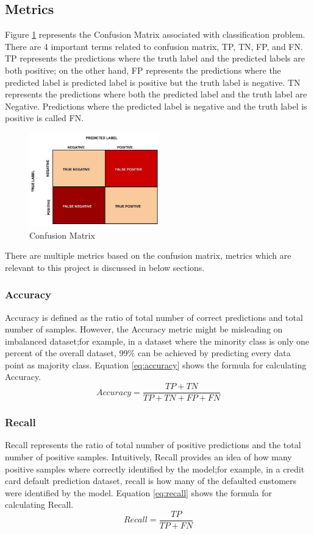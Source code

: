 \documentclass[twoside,11pt,a4paper]{article}
\begin{document}
\subsection{Metrics}
Figure \ref{fig:confusion_matrix} represents the Confusion Matrix associated with classification problem. There are 4 important terms related to confusion matrix, \acf{TP}, \acf{TN}, \acf{FP}, and \acf{FN}. \acs{TP} represents the predictions where the truth label and the predicted labels are both positive; on the other hand, \acs{FP} represents the predictions where the predicted label is predicted label is positive but the truth label is negative. \acs{TN} represents the predictions where both the predicted label and the truth label are Negative. Predictions where the predicted label is negative and the truth label is positive is called \acs{FN}.
\begin{figure}[ht]
	\centering
	\includegraphics[width=0.5\textwidth]{confusion_matrix}
	\caption[Confusion Matrix]{Confusion Matrix \citep{confusion_matrix}}
	\label{fig:confusion_matrix}
\end{figure}
There are multiple metrics based on the confusion matrix, metrics which are relevant to this project is discussed in below sections.
\subsubsection{Accuracy}
Accuracy is defined as the ratio of total number of correct predictions and total number of samples. However, the Accuracy metric might be misleading on imbalanced dataset;for example, in a dataset where the minority class is only one percent of the overall dataset, 99\% can be achieved by predicting every data point as majority class. Equation \ref{eq:accuracy} shows the formula for calculating Accuracy.
\begin{equation} \label{eq:accuracy}
	Accuracy = \frac{TP+TN}{TP+TN+FP+FN}
\end{equation}
\subsubsection{Recall}
Recall represents the ratio of total number of positive predictions and the total number of positive samples. Intuitively, Recall provides an idea of how many positive samples where correctly identified by the model;for example, in a credit card default prediction dataset, recall is how many of the defaulted customers were identified by the model. Equation \ref{eq:recall} shows the formula for calculating Recall.
\begin{equation}\label{eq:recall}
	Recall = \frac{TP}{TP+FN}
\end{equation}
\end{document}
